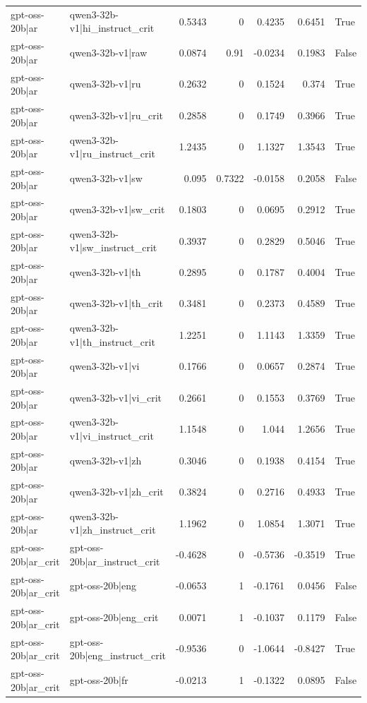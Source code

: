 \begin{table}
\begin{tabular}{l l r r r r l}
gpt-oss-20b|ar & qwen3-32b-v1|hi_instruct_crit & 0.5343 & 0 & 0.4235 & 0.6451 & True \\
gpt-oss-20b|ar & qwen3-32b-v1|raw & 0.0874 & 0.91 & -0.0234 & 0.1983 & False \\
gpt-oss-20b|ar & qwen3-32b-v1|ru & 0.2632 & 0 & 0.1524 & 0.374 & True \\
gpt-oss-20b|ar & qwen3-32b-v1|ru_crit & 0.2858 & 0 & 0.1749 & 0.3966 & True \\
gpt-oss-20b|ar & qwen3-32b-v1|ru_instruct_crit & 1.2435 & 0 & 1.1327 & 1.3543 & True \\
gpt-oss-20b|ar & qwen3-32b-v1|sw & 0.095 & 0.7322 & -0.0158 & 0.2058 & False \\
gpt-oss-20b|ar & qwen3-32b-v1|sw_crit & 0.1803 & 0 & 0.0695 & 0.2912 & True \\
gpt-oss-20b|ar & qwen3-32b-v1|sw_instruct_crit & 0.3937 & 0 & 0.2829 & 0.5046 & True \\
gpt-oss-20b|ar & qwen3-32b-v1|th & 0.2895 & 0 & 0.1787 & 0.4004 & True \\
gpt-oss-20b|ar & qwen3-32b-v1|th_crit & 0.3481 & 0 & 0.2373 & 0.4589 & True \\
gpt-oss-20b|ar & qwen3-32b-v1|th_instruct_crit & 1.2251 & 0 & 1.1143 & 1.3359 & True \\
gpt-oss-20b|ar & qwen3-32b-v1|vi & 0.1766 & 0 & 0.0657 & 0.2874 & True \\
gpt-oss-20b|ar & qwen3-32b-v1|vi_crit & 0.2661 & 0 & 0.1553 & 0.3769 & True \\
gpt-oss-20b|ar & qwen3-32b-v1|vi_instruct_crit & 1.1548 & 0 & 1.044 & 1.2656 & True \\
gpt-oss-20b|ar & qwen3-32b-v1|zh & 0.3046 & 0 & 0.1938 & 0.4154 & True \\
gpt-oss-20b|ar & qwen3-32b-v1|zh_crit & 0.3824 & 0 & 0.2716 & 0.4933 & True \\
gpt-oss-20b|ar & qwen3-32b-v1|zh_instruct_crit & 1.1962 & 0 & 1.0854 & 1.3071 & True \\
gpt-oss-20b|ar_crit & gpt-oss-20b|ar_instruct_crit & -0.4628 & 0 & -0.5736 & -0.3519 & True \\
gpt-oss-20b|ar_crit & gpt-oss-20b|eng & -0.0653 & 1 & -0.1761 & 0.0456 & False \\
gpt-oss-20b|ar_crit & gpt-oss-20b|eng_crit & 0.0071 & 1 & -0.1037 & 0.1179 & False \\
gpt-oss-20b|ar_crit & gpt-oss-20b|eng_instruct_crit & -0.9536 & 0 & -1.0644 & -0.8427 & True \\
gpt-oss-20b|ar_crit & gpt-oss-20b|fr & -0.0213 & 1 & -0.1322 & 0.0895 & False \\

\end{tabular}
\end{table}
